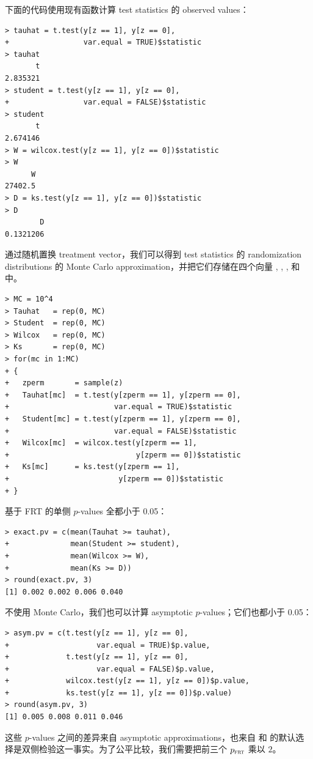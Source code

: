 下面的代码使用现有函数计算 test statistics 的 observed values：
\begin{lstlisting}
> tauhat = t.test(y[z == 1], y[z == 0], 
+                 var.equal = TRUE)$statistic
> tauhat
       t 
2.835321 
> student = t.test(y[z == 1], y[z == 0],
+                 var.equal = FALSE)$statistic
> student
       t 
2.674146 
> W = wilcox.test(y[z == 1], y[z == 0])$statistic
> W
      W 
27402.5 
> D = ks.test(y[z == 1], y[z == 0])$statistic
> D
        D 
0.1321206 
\end{lstlisting}

通过随机置换 treatment vector，我们可以得到 test statistics 的 randomization distributions 的 Monte Carlo approximation，并把它们存储在四个向量 , , , 和  中。
\begin{lstlisting}
> MC = 10^4
> Tauhat   = rep(0, MC)
> Student  = rep(0, MC)
> Wilcox   = rep(0, MC)
> Ks       = rep(0, MC)
> for(mc in 1:MC)
+ {
+   zperm       = sample(z)
+   Tauhat[mc]  = t.test(y[zperm == 1], y[zperm == 0], 
+                        var.equal = TRUE)$statistic 
+   Student[mc] = t.test(y[zperm == 1], y[zperm == 0], 
+                        var.equal = FALSE)$statistic
+   Wilcox[mc]  = wilcox.test(y[zperm == 1], 
+                             y[zperm == 0])$statistic 
+   Ks[mc]      = ks.test(y[zperm == 1], 
+                         y[zperm == 0])$statistic
+ }
\end{lstlisting}



基于 FRT 的单侧 $p$-values 全都小于 0.05：
\begin{lstlisting}
> exact.pv = c(mean(Tauhat >= tauhat),
+              mean(Student >= student),
+              mean(Wilcox >= W),
+              mean(Ks >= D))
> round(exact.pv, 3)
[1] 0.002 0.002 0.006 0.040
\end{lstlisting}
不使用 Monte Carlo，我们也可以计算 asymptotic $p$-values；它们也都小于 0.05：
\begin{lstlisting}
> asym.pv = c(t.test(y[z == 1], y[z == 0], 
+                    var.equal = TRUE)$p.value, 
+             t.test(y[z == 1], y[z == 0], 
+                    var.equal = FALSE)$p.value,
+             wilcox.test(y[z == 1], y[z == 0])$p.value,
+             ks.test(y[z == 1], y[z == 0])$p.value)
> round(asym.pv, 3)
[1] 0.005 0.008 0.011 0.046
\end{lstlisting}

这些 $p$-values 之间的差异来自 asymptotic approximations，也来自  和  的默认选择是双侧检验这一事实。为了公平比较，我们需要把前三个 $p_{\textsc{frt}}$ 乘以 $2$。


